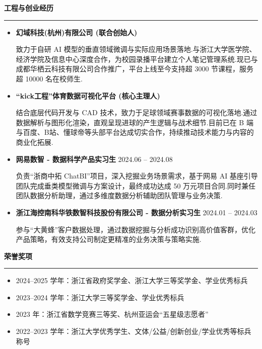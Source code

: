 \vspace{2em}
\noindent\textbf{工程与创业经历} \\
\rule{\textwidth}{0.5pt}
\begin{itemize}
    \item \textbf{幻域科技(杭州)有限公司 (联合创始人)}
    \par 致力于自研 AI 模型的垂直领域微调与实际应用场景落地.与浙江大学医学院、经济学院及信息中心深度合作，为校园录播平台建立个人笔记管理系统.现已与成都华栖云科技有限公司合作推广，平台上线至今支持超 3000 节课程，服务超 10000 名在校师生.

    \item \textbf{“kick工程”体育数据可视化平台 (核心主理人)}
    \par 结合底层代码开发与 CAD 技术，致力于足球领域赛事数据的可视化落地.通过数据解析与图形化渲染，直观呈现进球的产生逻辑与战术细节.目前已在 B 端与百度、B站、懂球帝等头部平台达成切实合作，持续推动技术能力与内容的商业化拓展.
    
    \item \textbf{网易数智 - 数据科学产品实习生} \hfill 2024.06 -- 2024.08
    \par 负责“浙商中拓 ChatBI”项目，深入挖掘业务场景需求，基于网易 AI 基座引导团队完成垂类模型微调与方案设计，最终成功达成 50 万元项目合同.同时兼任团队数据分析助理，通过多维度数据分析辅助团队管理与业务决策.
    
    \item \textbf{浙江海控南科华铁数智科技股份有限公司 - 数据分析实习生} \hfill 2024.01 -- 2024.03
    \par 参与“大黄蜂”客户数据处理，通过数据挖掘与分析成功识别高价值客群，优化产品策略，有效支持公司制定更精准的业务决策与策略实施.
\end{itemize}

\vspace{2em}
\noindent\textbf{荣誉奖项} \\
\rule{\textwidth}{0.5pt}
\begin{itemize}
    \item 2024--2025 学年：浙江省政府奖学金、浙江大学三等奖学金、学业优秀标兵
    \item 2023--2024 学年：浙江大学三等奖学金、学业优秀标兵
    \item 2023 年：浙江省数学竞赛三等奖、杭州亚运会“五星级志愿者”
    \item 2022--2023 学年：浙江大学优秀学生、文体/公益/创新创业/学业优秀等标兵称号
\end{itemize}